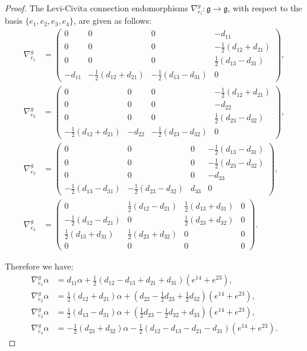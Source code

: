 \documentclass[10pt,reqno]{amsart}
\theoremstyle{definition}
\theoremstyle{remark}
\begin{document}
\begin{proof}
    The Levi-Civita connection endomorphisms $\nabla^g_{e_i}\colon\mathfrak{g}\to\mathfrak{g}$, with respect to the basis $\{e_1,e_2,e_3,e_4\}$, are given as follows: \begin{align*}
        \nabla^g_{e_1}&=\left(\begin{smallmatrix}
            0&0&0&-d_{11}\\
            0&0&0&-\frac{1}{2}(d_{12}+d_{21})\\
            0&0&0&\frac{1}{2}(d_{13}-d_{31})\\
            -d_{11}&-\frac{1}{2}(d_{12}+d_{21})&-\frac{1}{2}(d_{13}-d_{31})&0
        \end{smallmatrix}\right),\\
        \nabla^g_{e_2}&=\left(\begin{smallmatrix}
            0&0&0&-\frac{1}{2}(d_{12}+d_{21})\\
            0&0&0&-d_{22}\\
            0&0&0&\frac{1}{2}(d_{23}-d_{32})\\
            -\frac{1}{2}(d_{12}+d_{21})&-d_{22}&-\frac{1}{2}(d_{23}-d_{32})&0
        \end{smallmatrix}\right),\\
        \nabla^g_{e_3}&=\left(\begin{smallmatrix}
            0&0&0&-\frac{1}{2}(d_{13}-d_{31})\\
            0&0&0&-\frac{1}{2}(d_{23}-d_{32})\\
            0&0&0&-d_{33}\\
            -\frac{1}{2}(d_{13}-d_{31})&-\frac{1}{2}(d_{23}-d_{32})&d_{33}&0
        \end{smallmatrix}\right),\\
        \nabla^g_{e_4}&=\left(\begin{smallmatrix}
            0&\frac{1}{2}(d_{12}-d_{21})&\frac{1}{2}(d_{13}+d_{31})&0\\
            -\frac{1}{2}(d_{12}-d_{21})&0&\frac{1}{2}(d_{23}+d_{32})&0\\
            \frac{1}{2}(d_{13}+d_{31})&\frac{1}{2}(d_{23}+d_{32})&0&0\\
            0&0&0&0
        \end{smallmatrix}\right).
    \end{align*}
    
    Therefore we have: \begin{align*}
        \nabla^g_{e_1}\alpha&=d_{11}\alpha+\tfrac{1}{2}(d_{12}-d_{13}+d_{21}+d_{31})(e^{14}+e^{23}),\\
        \nabla^g_{e_2}\alpha&=\tfrac{1}{2}(d_{12}+d_{21})\alpha+(d_{22}-\tfrac{1}{2}d_{23}+\tfrac{1}{2}d_{32})(e^{14}+e^{23}),\\
        \nabla^g_{e_3}\alpha&=\tfrac{1}{2}(d_{13}-d_{31})\alpha+(\tfrac{1}{2}d_{23}-\tfrac{1}{2}d_{32}+d_{33})(e^{14}+e^{23}),\\
        \nabla^g_{e_4}\alpha&=-\tfrac{1}{2}(d_{23}+d_{32})\alpha-\tfrac{1}{2}(d_{12}-d_{13}-d_{21}-d_{31})(e^{14}+e^{23}).
    \end{align*}


\end{proof}
\end{document}
